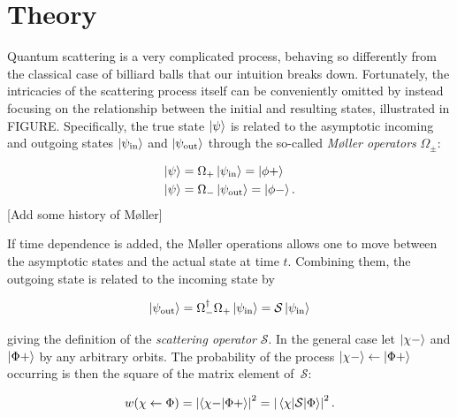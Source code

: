 \section{Theory}\label{sec:Theory}

\newcommand{\state}{\ket{\psi}}
\newcommand{\hoket}{\ket{\phi}}
\newcommand{\hoep}{\ket{\phi +}}
\newcommand{\hoem}{\ket{\phi -}}
\newcommand{\pin}{\psi_\text{in}}
\newcommand{\pout}{\psi_\text{out}}
\newcommand{\kpin}{\ket{\psi_\text{in}}}
\newcommand{\kpout}{\ket{\psi_\text{out}}}
\newcommand{\mop}{\Omega_{+}}
\newcommand{\mom}{\Omega_{-}}
\newcommand{\melt}[3]{\left|\mel{#1}{#2}{#3}\right|^{2}}
\newcommand{\scat}{\mathcal{S}}
\newcommand{\mscat}{\(\scat\)}
\newcommand{\oop}[1]{\mathcal{#1}}
\newcommand{\moop}[1]{\(\oop{#1}\)}
Quantum scattering is a very complicated process, behaving so differently from the
classical case of billiard balls that our intuition breaks down. Fortunately, the intricacies of
the scattering process itself can be conveniently omitted by instead focusing on
the relationship between the initial and resulting states, illustrated in FIGURE.
Specifically, the true state \(\ket{\psi}\) is related to the asymptotic
incoming and outgoing states \(\kpin\) and \(\kpout\) through the so-called
\textit{M\o ller operators} \(\Omega_{\pm}\):

\begin{align*}
  \state &= \mop\kpin = \hoep\\
  \state &= \mom\kpout = \hoem .
\end{align*}
[Add some history of Møller]

If time dependence is added, the M\o{}ller operations allows one to move between
the asymptotic states and the actual state at time \(t\).
Combining them, the outgoing state is related to the incoming state by

\begin{equation*}
  \kpout = \mom^{\dagger}\mop\kpin = \scat\kpin
\end{equation*}

giving the definition of the \textit{scattering operator} \mscat.
In the general case let \(\ket{\chi -}\) and \(\ket{\Phi +}\) by any arbitrary
orbits. The probability of the process \(\ket{\chi -}\leftarrow\ket{\Phi +}\)
occurring is
then the square of the  matrix element of\ \mscat :

\begin{equation*}
  w(\chi \leftarrow \Phi) = \left| \ip{\chi -}{\Phi +} \right|^{2} = \melt{\chi}{\scat}{\Phi}.
\end{equation*}

